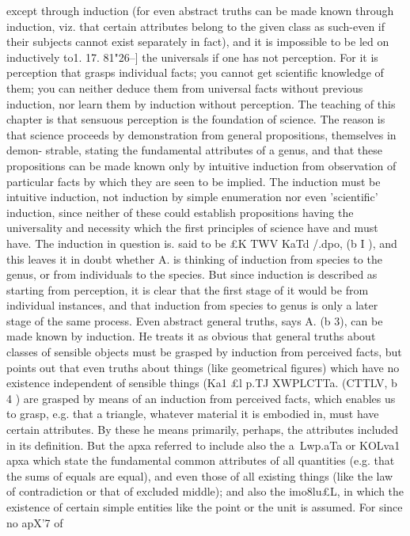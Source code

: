 {{{{{{{{{{{{{{except through induction (for even abstract truths can be made
known through induction, viz. that certain attributes belong to
the given class as such-even if their subjects cannot exist
separately in fact), and it is impossible to be led on inductively to1. 17. 81"26--]
the universals if one has not perception. For it is perception
that grasps individual facts; you cannot get scientific knowledge
of them; you can neither deduce them from universal facts
without previous induction, nor learn them by induction without
perception.
The teaching of this chapter is that sensuous perception is the
foundation of science. The reason is that science proceeds by
demonstration from general propositions, themselves in demon-
strable, stating the fundamental attributes of a genus, and that
these propositions can be made known only by intuitive induction
from observation of particular facts by which they are seen to
be implied. The induction must be intuitive induction, not
induction by simple enumeration nor even 'scientific' induction,
since neither of these could establish propositions having the
universality and necessity which the first principles of science
have and must have.
The induction in question is. said to be £K TWV KaTd /.dpo, (b I ),
and this leaves it in doubt whether A. is thinking of induction
from species to the genus, or from individuals to the species. But
since induction is described as starting from perception, it is clear
that the first stage of it would be from individual instances, and
that induction from species to genus is only a later stage of the
same process.
Even abstract general truths, says A. (b 3), can be made known
by induction. He treats it as obvious that general truths about
classes of sensible objects must be grasped by induction from
perceived facts, but points out that even truths about things (like
geometrical figures) which have no existence independent of
sensible things (Ka1 £l p.TJ XWPLCTTa. (CTTLV, b 4 ) are grasped by means of
an induction from perceived facts, which enables us to grasp,
e.g. that a triangle, whatever material it is embodied in, must
have certain attributes. By these he means primarily, perhaps,
the attributes included in its definition. But the apxa{ referred
to include also the a~Lwp.aTa or KOLva1 apxa{ which state the
fundamental common attributes of all quantities (e.g. that the
sums of equals are equal), and even those of all existing things
(like the law of contradiction or that of excluded middle); and
also the imo8lu£L, in which the existence of certain simple
entities like the point or the unit is assumed. For since no apX'7 of
}}}}}}}}}}}}}}}}

